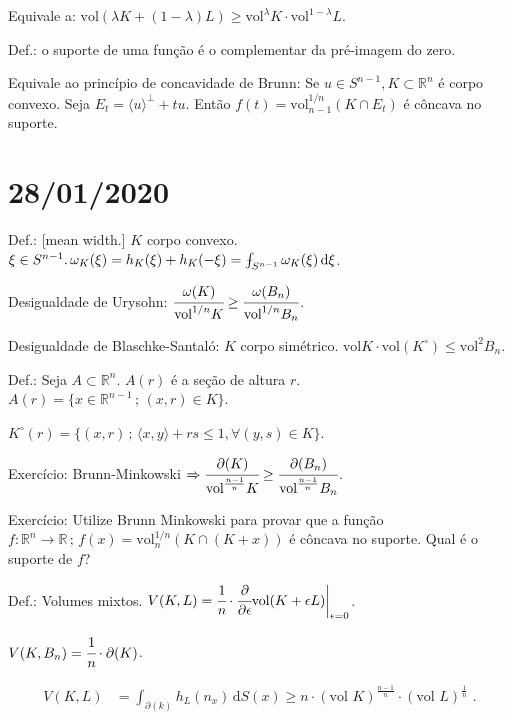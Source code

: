 \documentclass[12pt]{article}
\def\Xint#1{\mathchoice
{\XXint\displaystyle\textstyle{#1}}%
{\XXint\textstyle\scriptstyle{#1}}%
{\XXint\scriptstyle\scriptscriptstyle{#1}}%
{\XXint\scriptscriptstyle\scriptscriptstyle{#1}}%
\!\int}
\def\XXint#1#2#3{{\setbox0=\hbox{$#1{#2#3}{\int}$ }
\vcenter{\hbox{$#2#3$ }}\kern-.6\wd0}}
\def\dashint{\Xint-}
\begin{document}
Equivale a: $\text{vol} (\lambda K + (1 - \lambda) L) \ge \text{vol}^\lambda K \cdot \text{vol}^{1 - \lambda} L$.

Def.: o suporte de uma fun\c{c}\~ao \'e o complementar da pr\'e-imagem do zero.

Equivale ao princ\'ipio de concavidade de Brunn: Se $u \in S^{n - 1}, K \subset \mathbb{R}^n$ \'e corpo convexo. Seja $E_t = \langle u \rangle^\perp + tu$. Ent\~ao $f(t) = \text{vol}_{n - 1}^{1/n}(K \cap E_t)$ \'e c\^oncava no suporte.

\section{28/01/2020}

\begin{flushright}
\end{flushright}

Def.: [mean width.] $K$ corpo convexo. $\xi \in S^{n - 1}.\,\omega_K(\xi) = h_K(\xi) + h_K(-\xi) = \dashint_{S^{n-1}} \omega_K(\xi)\,\mathrm{d}\xi$.

Desigualdade de Urysohn: $\cfrac{\omega(K)}{\text{vol}^{1/n} K} \ge \cfrac{\omega(B_n)}{\text{vol}^{1/n} B_n}$.

Desigualdade de Blaschke-Santal\'o: $K$ corpo sim\'etrico. $\text{vol} K\cdot \text{vol}(K^\circ) \le \text{vol}^2 B_n$.

Def.: Seja $A \subset \mathbb{R}^n$. $A(r)$ \'e a se\c{c}\~ao de altura $r$. $A(r) = \{x \in \mathbb{R}^{n-1} \,;\,(x,r)\in K\}$.

$K^\circ(r) = \{ (x, r)\,;\,\langle x, y \rangle + rs \le 1, \forall (y, s) \in K \}$.

Exerc\'icio: Brunn-Minkowski $\Rightarrow \cfrac{\partial(K)}{\text{vol}^{\frac{n-1}{n}} K} \ge \cfrac{\partial(B_n)}{\text{vol}^{\frac{n-1}{n}} B_n}$.

Exerc\'icio: Utilize Brunn Minkowski para provar que a fun\c{c}\~ao $f : \mathbb{R}^n \to \mathbb{R}\,;\,f(x) = \text{vol}_n^{1/n} (K \cap (K + x))$ \'e c\^oncava no suporte. Qual \'e o suporte de $f$?

Def.: Volumes mixtos. $V(K, L) = \cfrac{1}{n}\cdot \cfrac{\partial}{\partial \epsilon} \text{vol}(K + \epsilon L)\bigg\vert_{\epsilon = 0}$.

$V(K, B_n) = \cfrac{1}{n}\cdot \partial(K)$.

\begin{align}
V(K, L) &= \int_{\partial(k)} h_L(n_x) \,\mathrm{d}S(x) \ge n\cdot (\text{vol }K)^{\frac{n-1}{n}}\cdot (\text{vol }L)^{\frac{1}{n}}\,\,.
\end{align}
\end{document}

